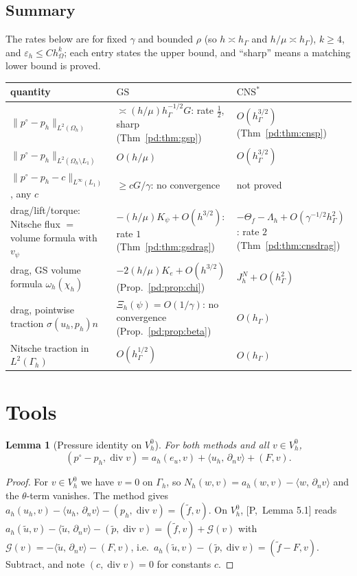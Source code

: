 \documentclass[11pt,reqno]{amsart}
\theoremstyle{plain}
\newtheorem{lemma}[theorem]{Lemma}
\theoremstyle{definition}
\newcommand{\hG}{h_\Gamma}
\newcommand{\hO}{h_\Omega}
\newcommand{\Gh}{\Gamma_h}
\newcommand{\Oh}{\Omega_h}
\newcommand{\VO}{V_h^0}
\newcommand{\dn}{\partial_n}
\newcommand{\ut}{\tilde u}
\newcommand{\pt}{\tilde p}
\newcommand{\ft}{\tilde f}
\newcommand{\ip}[2]{\langle #1,\, #2\rangle}
\newcommand{\norm}[1]{\lVert #1\rVert}
\newcommand{\GS}{\mathrm{GS}}
\newcommand{\CNS}{\mathrm{CNS}^\ast}
\newcommand{\eps}{\varepsilon_h}
\renewcommand{\div}{\operatorname{div}}
\newcommand{\Gc}{\mathcal G}
\newcommand{\Pref}[1]{\textup{[P,~#1]}}
\newcommand{\Lay}{L_1}
\begin{document}
\subsection{Summary}
The rates below are for fixed $\gamma$ and bounded $\rho$ (so $h\asymp\hG$ and $h/\mu\asymp\hG$), $k\ge4$, and $\eps\le C\hO^k$; each entry states the upper bound, and ``sharp'' means a matching lower bound is proved.
\begin{center}\footnotesize
\begin{tabular}{>{\raggedright\arraybackslash}p{}>{\raggedright\arraybackslash}p{}>{\raggedright\arraybackslash}p{}}
\toprule
quantity & $\GS$ & $\CNS$\\
\midrule
$\norm{p^\circ-p_h}_{L^2(\Oh)}$ & $\asymp(h/\mu)\hG^{-1/2}G$: rate $\frac12$, sharp (Thm~\ref{pd:thm:gsp}) & $O(\hG^{3/2})$ (Thm~\ref{pd:thm:cnsp})\\
$\norm{p^\circ-p_h}_{L^2(\Oh\setminus\Lay)}$ & $O(h/\mu)$ & $O(\hG^{3/2})$\\
$\norm{p^\circ-p_h-c}_{L^\infty(\Lay)}$, any $c$ & $\ge cG/\gamma$: no convergence & not proved\\
drag/lift/torque: Nitsche flux $=$ volume formula with $v_\psi$ & $-(h/\mu)K_\psi+O(h^{3/2})$: rate $1$ (Thm~\ref{pd:thm:gsdrag}) & $-\Theta_f-\Lambda_h+O(\gamma^{-1/2}\hG^2)$: rate $2$ (Thm~\ref{pd:thm:cnsdrag})\\
drag, GS volume formula $\omega_h(\chi_h)$ & $-2(h/\mu)K_e+O(h^{3/2})$ (Prop.~\ref{pd:prop:chi}) & $J^N_h+O(\hG^2)$\\
drag, pointwise traction $\sigma(u_h,p_h)n$ & $\Xi_h(\psi)=O(1/\gamma)$: no convergence (Prop.~\ref{pd:prop:beta}) & $O(\hG)$\\
Nitsche traction in $L^2(\Gh)$ & $O(\hG^{1/2})$ & $O(\hG)$\\
\bottomrule
\end{tabular}
\end{center}

\section{Tools}\label{pd:sec:tools}

\begin{lemma}[Pressure identity on $\VO$]\label{pd:lem:v0}
For both methods and all $v\in\VO$,
\[
(p^\circ-p_h,\div v)=a_h(e_u,v)+\ip{u_h}{\dn v}+(F,v).
\]
\end{lemma}

\begin{proof}
For $v\in\VO$ we have $v=0$ on $\Gh$, so $N_h(w,v)=a_h(w,v)-\ip{w}{\dn v}$ and the $\theta$-term vanishes. The method gives $a_h(u_h,v)-\ip{u_h}{\dn v}-(p_h,\div v)=(\ft,v)$. On $\VO$, \Pref{Lemma 5.1} reads $a_h(\ut,v)-\ip{\ut}{\dn v}-(\pt,\div v)=(\ft,v)+\Gc(v)$ with $\Gc(v)=-\ip{\ut}{\dn v}-(F,v)$, i.e.\ $a_h(\ut,v)-(\pt,\div v)=(\ft-F,v)$. Subtract, and note $(c,\div v)=0$ for constants $c$.
\end{proof}
\end{document}
